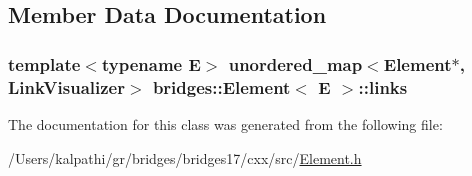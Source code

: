 \subsection{Member Data Documentation}
\hypertarget{classbridges_1_1_element_a6fb53728edc378f26238543b26238496}{}
\subsubsection[{links}]{\setlength{\rightskip}{0pt plus 5cm}template$<$typename E$>$ unordered\+\_\+map$<${\bf Element}$\ast$, {\bf Link\+Visualizer}$>$ {\bf bridges\+::\+Element}$<$ E $>$\+::links\hspace{0.3cm}{\ttfamily [protected]}}\label{classbridges_1_1_element_a6fb53728edc378f26238543b26238496}


The documentation for this class was generated from the following file\+:\begin{DoxyCompactItemize}
\item 
/\+Users/kalpathi/gr/bridges/bridges17/cxx/src/\hyperlink{_element_8h}{Element.\+h}\end{DoxyCompactItemize}
